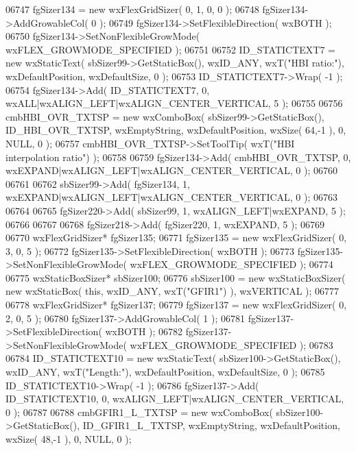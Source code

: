 \begin{DoxyCode}
06747     fgSizer134 = \textcolor{keyword}{new} wxFlexGridSizer( 0, 1, 0, 0 );
06748     fgSizer134->AddGrowableCol( 0 );
06749     fgSizer134->SetFlexibleDirection( wxBOTH );
06750     fgSizer134->SetNonFlexibleGrowMode( wxFLEX\_GROWMODE\_SPECIFIED );
06751     
06752     ID_STATICTEXT7 = \textcolor{keyword}{new} wxStaticText( sbSizer99->GetStaticBox(), wxID\_ANY, wxT(\textcolor{stringliteral}{"HBI ratio:"}), 
      wxDefaultPosition, wxDefaultSize, 0 );
06753     ID_STATICTEXT7->Wrap( -1 );
06754     fgSizer134->Add( ID_STATICTEXT7, 0, wxALL|wxALIGN\_LEFT|wxALIGN\_CENTER\_VERTICAL, 5 );
06755     
06756     cmbHBI_OVR_TXTSP = \textcolor{keyword}{new} wxComboBox( sbSizer99->GetStaticBox(), 
      ID_HBI_OVR_TXTSP, wxEmptyString, wxDefaultPosition, wxSize( 64,-1 ), 0, NULL, 0 ); 
06757     cmbHBI_OVR_TXTSP->SetToolTip( wxT(\textcolor{stringliteral}{"HBI interpolation ratio"}) );
06758     
06759     fgSizer134->Add( cmbHBI_OVR_TXTSP, 0, wxEXPAND|wxALIGN\_LEFT|wxALIGN\_CENTER\_VERTICAL, 0 );
06760     
06761     
06762     sbSizer99->Add( fgSizer134, 1, wxEXPAND|wxALIGN\_LEFT|wxALIGN\_CENTER\_VERTICAL, 0 );
06763     
06764     
06765     fgSizer220->Add( sbSizer99, 1, wxALIGN\_LEFT|wxEXPAND, 5 );
06766     
06767     
06768     fgSizer218->Add( fgSizer220, 1, wxEXPAND, 5 );
06769     
06770     wxFlexGridSizer* fgSizer135;
06771     fgSizer135 = \textcolor{keyword}{new} wxFlexGridSizer( 0, 3, 0, 5 );
06772     fgSizer135->SetFlexibleDirection( wxBOTH );
06773     fgSizer135->SetNonFlexibleGrowMode( wxFLEX\_GROWMODE\_SPECIFIED );
06774     
06775     wxStaticBoxSizer* sbSizer100;
06776     sbSizer100 = \textcolor{keyword}{new} wxStaticBoxSizer( \textcolor{keyword}{new} wxStaticBox( \textcolor{keyword}{this}, wxID\_ANY, wxT(\textcolor{stringliteral}{"GFIR1"}) ), wxVERTICAL );
06777     
06778     wxFlexGridSizer* fgSizer137;
06779     fgSizer137 = \textcolor{keyword}{new} wxFlexGridSizer( 0, 2, 0, 5 );
06780     fgSizer137->AddGrowableCol( 1 );
06781     fgSizer137->SetFlexibleDirection( wxBOTH );
06782     fgSizer137->SetNonFlexibleGrowMode( wxFLEX\_GROWMODE\_SPECIFIED );
06783     
06784     ID_STATICTEXT10 = \textcolor{keyword}{new} wxStaticText( sbSizer100->GetStaticBox(), wxID\_ANY, wxT(\textcolor{stringliteral}{"Length:"}), 
      wxDefaultPosition, wxDefaultSize, 0 );
06785     ID_STATICTEXT10->Wrap( -1 );
06786     fgSizer137->Add( ID_STATICTEXT10, 0, wxALIGN\_LEFT|wxALIGN\_CENTER\_VERTICAL, 0 );
06787     
06788     cmbGFIR1_L_TXTSP = \textcolor{keyword}{new} wxComboBox( sbSizer100->GetStaticBox(), 
      ID_GFIR1_L_TXTSP, wxEmptyString, wxDefaultPosition, wxSize( 48,-1 ), 0, NULL, 0 ); 

\end{DoxyCode}
